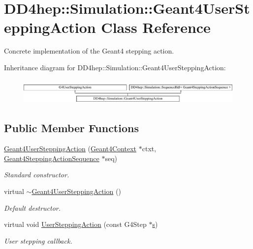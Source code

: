 \hypertarget{class_d_d4hep_1_1_simulation_1_1_geant4_user_stepping_action}{}\section{D\+D4hep\+:\+:Simulation\+:\+:Geant4\+User\+Stepping\+Action Class Reference}
\label{class_d_d4hep_1_1_simulation_1_1_geant4_user_stepping_action}


Concrete implementation of the Geant4 stepping action.  


Inheritance diagram for D\+D4hep\+:\+:Simulation\+:\+:Geant4\+User\+Stepping\+Action\+:\begin{figure}[H]
\begin{center}
\leavevmode
\includegraphics[height=1.349398cm]{class_d_d4hep_1_1_simulation_1_1_geant4_user_stepping_action}
\end{center}
\end{figure}
\subsection*{Public Member Functions}
\begin{DoxyCompactItemize}
\item 
\hyperlink{class_d_d4hep_1_1_simulation_1_1_geant4_user_stepping_action_a846e10589493c89d4ed2081312d17a1d}{Geant4\+User\+Stepping\+Action} (\hyperlink{class_d_d4hep_1_1_simulation_1_1_geant4_context}{Geant4\+Context} $\ast$ctxt, \hyperlink{class_d_d4hep_1_1_simulation_1_1_geant4_stepping_action_sequence}{Geant4\+Stepping\+Action\+Sequence} $\ast$seq)
\begin{DoxyCompactList}\small\item\em Standard constructor. \end{DoxyCompactList}\item 
virtual \hyperlink{class_d_d4hep_1_1_simulation_1_1_geant4_user_stepping_action_a7c9e7f202db5ebf3300c1d2c6d9aa1d2}{$\sim$\+Geant4\+User\+Stepping\+Action} ()
\begin{DoxyCompactList}\small\item\em Default destructor. \end{DoxyCompactList}\item 
virtual void \hyperlink{class_d_d4hep_1_1_simulation_1_1_geant4_user_stepping_action_a459952dec8bab794c933b464471d7b60}{User\+Stepping\+Action} (const G4\+Step $\ast$\hyperlink{_volumes_8cpp_a17ca6bfc8040d695d3cada22a4763d40}{s})
\begin{DoxyCompactList}\small\item\em User stepping callback. \end{DoxyCompactList}\end{DoxyCompactItemize}
